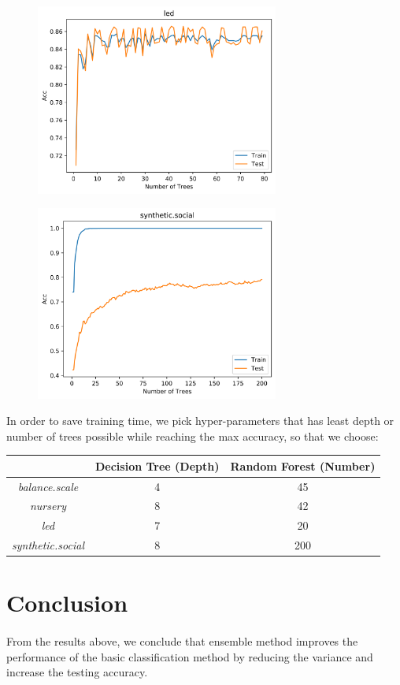 \documentclass[11pt]{article}
\begin{document}
	\begin{figure}[H]
  		\begin{center}
  			\includegraphics[width=8cm]{code/pics/led_RandomForest}
  		\end{center}
	\end{figure}
	\begin{figure}[H]
  		\begin{center}
  			\includegraphics[width=8cm]{code/pics/synthetic_social_RandomForest}
  		\end{center}
	\end{figure}
	
	In order to save training time, we pick hyper-parameters that has least depth or number of trees possible while reaching the max accuracy, so that we choose:
	\begin{center}
		\begin{tabular}{|c | c | c |}
			\hline
			& Decision Tree (Depth) & Random Forest (Number)\\
			\hline
			\textit{balance.scale} & 4 & 45\\
			\hline
			\textit{nursery} & 8 & 42\\
			\hline
			\textit{led} & 7 & 20\\
			\hline
			\textit{synthetic.social} & 8 & 200\\
			\hline
		\end{tabular}
	\end{center}
	
	\section{Conclusion}
	\paragraph{}
	From the results above, we conclude that ensemble method improves the performance of the basic classification method by reducing the variance and increase the testing accuracy.
\end{document}
